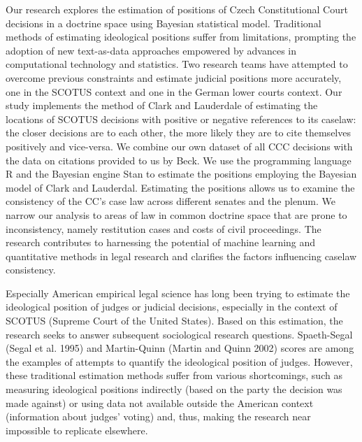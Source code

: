 \documentclass[
  11pt,
]{article}
\renewenvironment{abstract}
 {{%
    \setlength{\leftmargin}{0mm}
    \setlength{\rightmargin}{\leftmargin}%
  }%
  \relax}
 {\endlist}
\begin{document}
\begin{abstract}


    \vskip 8.5pt %

\noindent \small{Our research explores the estimation of positions of
Czech Constitutional Court decisions in a doctrine space using Bayesian
statistical model. Traditional methods of estimating ideological
positions suffer from limitations, prompting the adoption of new
text-as-data approaches empowered by advances in computational
technology and statistics. Two research teams have attempted to overcome
previous constraints and estimate judicial positions more accurately,
one in the SCOTUS context and one in the German lower courts context.
Our study implements the method of Clark and Lauderdale of estimating
the locations of SCOTUS decisions with positive or negative references
to its caselaw: the closer decisions are to each other, the more likely
they are to cite themselves positively and vice-versa. We combine our
own dataset of all CCC decisions with the data on citations provided to
us by Beck. We use the programming language R and the Bayesian engine
Stan to estimate the positions employing the Bayesian model of Clark and
Lauderdal. Estimating the positions allows us to examine the consistency
of the CC's case law across different senates and the plenum. We narrow
our analysis to areas of law in common doctrine space that are prone to
inconsistency, namely restitution cases and costs of civil proceedings.
The research contributes to harnessing the potential of machine learning
and quantitative methods in legal research and clarifies the factors
influencing caselaw consistency.}




\end{abstract}


\vskip -8.5pt




\setlength{\parindent}{16pt}
\setlength{\parskip}{0pt}

\vspace{30pt}

Especially American empirical legal science has long been trying to
estimate the ideological position of judges or judicial decisions,
especially in the context of SCOTUS (Supreme Court of the United
States). Based on this estimation, the research seeks to answer
subsequent sociological research questions. Spaeth-Segal (Segal et al.
1995) and Martin-Quinn (Martin and Quinn 2002) scores are among the
examples of attempts to quantify the ideological position of judges.
However, these traditional estimation methods suffer from various
shortcomings, such as measuring ideological positions indirectly (based
on the party the decision was made against) or using data not available
outside the American context (information about judges' voting) and,
thus, making the research near impossible to replicate elsewhere.
\end{document}
